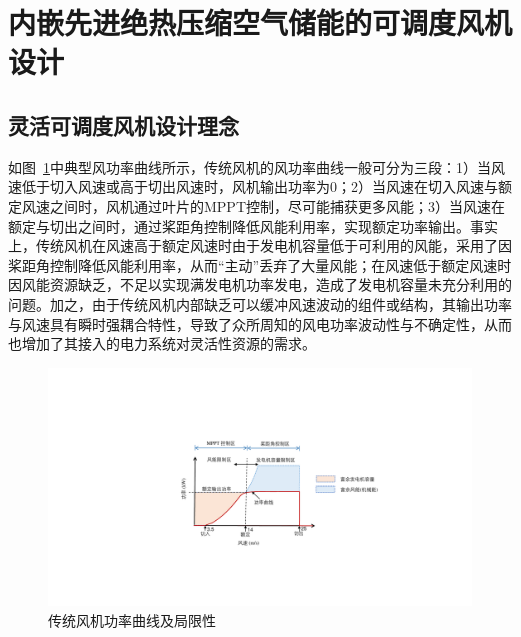 \section{内嵌先进绝热压缩空气储能的可调度风机设计}
\label{sec:ca-wt-design}
\subsection{灵活可调度风机设计理念}

如图~\ref{fig:WT-power-curve}中典型风功率曲线所示，传统风机的风功率曲线一般可分为三段：1）当风速低于切入风速或高于切出风速时，风机输出功率为0；2）当风速在切入风速与额定风速之间时，风机通过叶片的MPPT控制，尽可能捕获更多风能；3）当风速在额定与切出之间时，通过桨距角控制降低风能利用率，实现额定功率输出。事实上，传统风机在风速高于额定风速时由于发电机容量低于可利用的风能，采用了因桨距角控制降低风能利用率，从而“主动”丢弃了大量风能；在风速低于额定风速时因风能资源缺乏，不足以实现满发电机功率发电，造成了发电机容量未充分利用的问题\cite{CA-RECS-Model-Rui-18}。加之，由于传统风机内部缺乏可以缓冲风速波动的组件或结构，其输出功率与风速具有瞬时强耦合特性，导致了众所周知的风电功率波动性与不确定性，从而也增加了其接入的电力系统对灵活性资源的需求。

\begin{figure}[H] %
  \centering
  \includegraphics[scale=0.72]{figures/Chap5-1-WT-power-curve-V4.pdf}
  \caption{传统风机功率曲线及局限性}
  \label{fig:WT-power-curve}
\end{figure}

